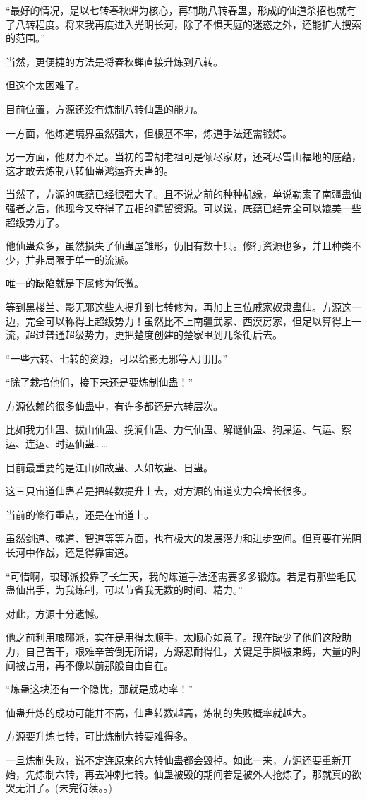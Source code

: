 \begin{this_body}
“最好的情况，是以七转春秋蝉为核心，再辅助八转春蛊，形成的仙道杀招也就有了八转程度。将来我再度进入光阴长河，除了不惧天庭的迷惑之外，还能扩大搜索的范围。”

当然，更便捷的方法是将春秋蝉直接升炼到八转。

但这个太困难了。

目前位置，方源还没有炼制八转仙蛊的能力。

一方面，他炼道境界虽然强大，但根基不牢，炼道手法还需锻炼。

另一方面，他财力不足。当初的雪胡老祖可是倾尽家财，还耗尽雪山福地的底蕴，这才敢去炼制八转仙蛊鸿运齐天蛊的。

当然了，方源的底蕴已经很强大了。且不说之前的种种机缘，单说勒索了南疆蛊仙强者之后，他现今又夺得了五相的遗留资源。可以说，底蕴已经完全可以媲美一些超级势力了。

他仙蛊众多，虽然损失了仙蛊屋雏形，仍旧有数十只。修行资源也多，并且种类不少，并非局限于单一的流派。

唯一的缺陷就是下属修为低微。

等到黑楼兰、影无邪这些人提升到七转修为，再加上三位戚家奴隶蛊仙。方源这一边，完全可以称得上超级势力！虽然比不上南疆武家、西漠房家，但足以算得上一流，超过普通超级势力，更把楚度创建的楚家甩到几条街后去。

“一些六转、七转的资源，可以给影无邪等人用用。”

“除了栽培他们，接下来还是要炼制仙蛊！”

方源依赖的很多仙蛊中，有许多都还是六转层次。

比如我力仙蛊、拔山仙蛊、挽澜仙蛊、力气仙蛊、解谜仙蛊、狗屎运、气运、察运、连运、时运仙蛊……

目前最重要的是江山如故蛊、人如故蛊、日蛊。

这三只宙道仙蛊若是把转数提升上去，对方源的宙道实力会增长很多。

当前的修行重点，还是在宙道上。

虽然剑道、魂道、智道等等方面，也有极大的发展潜力和进步空间。但真要在光阴长河中作战，还是得靠宙道。

“可惜啊，琅琊派投靠了长生天，我的炼道手法还需要多多锻炼。若是有那些毛民蛊仙出手，为我炼制，可以节省我无数的时间、精力。”

对此，方源十分遗憾。

他之前利用琅琊派，实在是用得太顺手，太顺心如意了。现在缺少了他们这股助力，自己苦干，艰难辛苦倒无所谓，方源忍耐得住，关键是手脚被束缚，大量的时间被占用，再不像以前那般自由自在。

“炼蛊这块还有一个隐忧，那就是成功率！”

仙蛊升炼的成功可能并不高，仙蛊转数越高，炼制的失败概率就越大。

方源要升炼七转，可比炼制六转要难得多。

一旦炼制失败，说不定连原来的六转仙蛊都会毁掉。如此一来，方源还要重新开始，先炼制六转，再去冲刺七转。仙蛊被毁的期间若是被外人抢炼了，那就真的欲哭无泪了。(未完待续。。)

\end{this_body}


